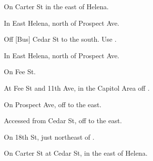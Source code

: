 

\begin{LocationList}

On Carter St in the east of Helena.

\Location{\GarageHQ \Garage}
In East Helena, north of  Prospect Ave.

Off [Bus] Cedar St to the south. Use  .

In East Helena, north of  Prospect Ave.

\Location{\RecruitmentAgency \Recruitment}
On Fee St.

At Fee St and 11th Ave, in the Capitol Area off  .

\Location{\TruckStop \Gas \Rest}
On  Prospect Ave, off   to the east.

Accessed from Cedar St, off   to the east.

On 18th St, just northeast of  .

On Carter St at Cedar St, in the east of Helena.

\end{LocationList}
